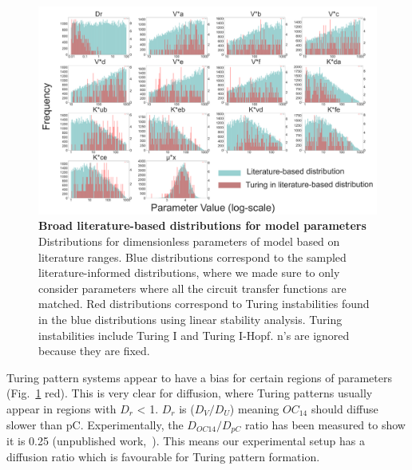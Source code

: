 \begin{figure}[H] %
    \centering
    \begin{adjustbox}{center}
        \includegraphics[width=1.2\textwidth]{chapters/Chapter 2/param_distributions} %
    \end{adjustbox}
    \caption{\textbf{Broad literature-based distributions for model parameters} Distributions for dimensionless parameters of model based on literature ranges.
    Blue distributions correspond to the sampled literature-informed distributions,
    where we made sure to only consider parameters where all the circuit transfer functions are matched.
    Red distributions correspond to Turing instabilities found in the blue distributions using linear stability analysis. Turing instabilities include Turing I and Turing I-Hopf. n's are ignored because they are fixed.}
    \label{fig:param_distributions_turing_vs_noturing} %
\end{figure}

Turing pattern systems appear to have a bias for certain regions of parameters (Fig.~\ref{fig:param_distributions_turing_vs_noturing} red).
This is very clear for diffusion, where Turing patterns usually appear in regions with $D_r$ < 1.
$D_r$ is ($D_V / D_U$) meaning $OC_{14}$ should diffuse slower than pC.
Experimentally, the $D_{OC14}/D_{pC}$ ratio has been measured to show it is 0.25 (unpublished work,~\cite{tica_diffusers}).
This means our experimental setup has a diffusion ratio which is favourable for Turing pattern formation.


